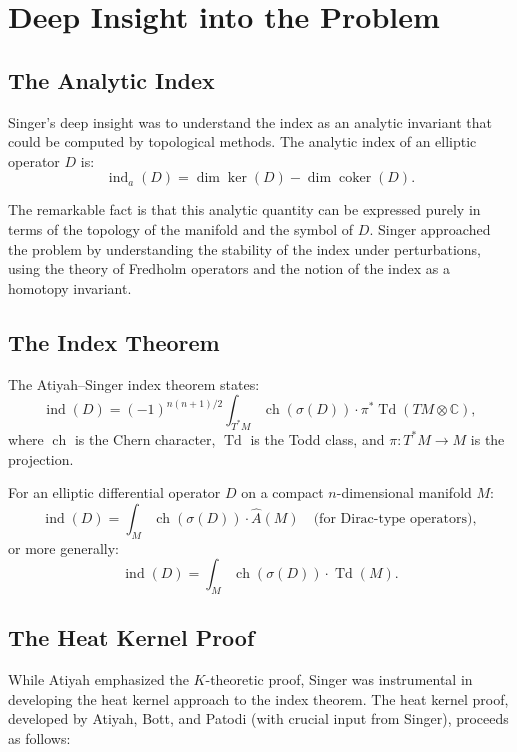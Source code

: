 \section{Deep Insight into the Problem}

\subsection{The Analytic Index}

Singer's deep insight was to understand the index as an analytic invariant that could be computed by topological methods. The analytic index of an elliptic operator $D$ is:
\[
\operatorname{ind}_a(D) = \dim \ker(D) - \dim \operatorname{coker}(D).
\]

The remarkable fact is that this analytic quantity can be expressed purely in terms of the topology of the manifold and the symbol of $D$. Singer approached the problem by understanding the stability of the index under perturbations, using the theory of Fredholm operators and the notion of the index as a homotopy invariant.

\subsection{The Index Theorem}

The Atiyah--Singer index theorem states:
\[
\operatorname{ind}(D) = (-1)^{n(n+1)/2} \int_{T^*M} \operatorname{ch}(\sigma(D)) \cdot \pi^* \operatorname{Td}(TM \otimes \mathbb{C}),
\]
where $\operatorname{ch}$ is the Chern character, $\operatorname{Td}$ is the Todd class, and $\pi: T^*M \to M$ is the projection.

For an elliptic differential operator $D$ on a compact $n$-dimensional manifold $M$:
\[
\operatorname{ind}(D) = \int_M \operatorname{ch}(\sigma(D)) \cdot \widehat A(M) \quad \text{(for Dirac-type operators)},
\]
or more generally:
\[
\operatorname{ind}(D) = \int_M \operatorname{ch}(\sigma(D)) \cdot \operatorname{Td}(M).
\]

\subsection{The Heat Kernel Proof}

While Atiyah emphasized the $K$-theoretic proof, Singer was instrumental in developing the heat kernel approach to the index theorem. The heat kernel proof, developed by Atiyah, Bott, and Patodi (with crucial input from Singer), proceeds as follows:

